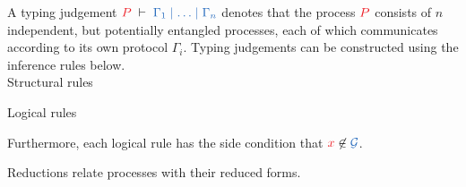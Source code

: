 \documentclass[UKenglish]{llncs}
\begin{document}
\begin{definition}\label{def:cp-typing-judgement}
  A typing judgement $\seq[P]{\Gamma_1 \hsep \dots \hsep \Gamma_n}$ denotes that the process $\tm{P}$ consists of $n$ independent, but potentially entangled processes, each of which communicates according to its own protocol $\Gamma_i$. Typing judgements can be constructed using the inference rules below. 
  \\[0.5\baselineskip]
  {Structural rules}
  \begin{center}
    \hcpInfAx
    \hcpInfCut
  \end{center}
  \begin{center}
    \hcpInfMix
    \hcpInfHalt
  \end{center}
  {Logical rules}
  \begin{center}
    \hcpInfBoundTens
    \hcpInfParr
  \end{center}
  \begin{center}
    \hcpInfOne
    \hcpInfBot
  \end{center}
  \begin{center}
  \end{center}
  \begin{center}
    \hcpInfWith
  \end{center}
  \begin{center}
    \hcpInfNil
    \hcpInfTop
  \end{center}
  Furthermore, each logical rule has the side condition that $\tm{x} \not\in \ty{\mathcal{G}}$.
\end{definition}
Reductions relate processes with their reduced forms.
\end{document}
